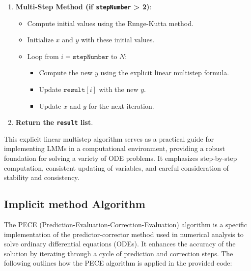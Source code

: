 \begin{enumerate}
        \item \textbf{Multi-Step Method (if \texttt{stepNumber} > 2)}:
        \begin{itemize}
            \item Compute initial values using the Runge-Kutta method.
            \item Initialize $x$ and $y$ with these initial values.
            \item Loop from $i = \texttt{stepNumber}$ to $N$:
            \begin{itemize}
                \item Compute the new $y$ using the explicit linear multistep formula.
                \item Update $\texttt{result}[i]$ with the new $y$.
                \item Update $x$ and $y$ for the next iteration.
            \end{itemize}
        \end{itemize}
        
        \item \textbf{Return the \texttt{result} list}.
    \end{enumerate}

This explicit linear multistep algorithm serves as a practical guide for implementing LMMs in a computational environment, providing a robust foundation for solving a variety of ODE problems. It emphasizes step-by-step computation, consistent updating of variables, and careful consideration of stability and consistency.

 \newpage


\subsection{Implicit method Algorithm}

The PECE (Prediction-Evaluation-Correction-Evaluation) algorithm is a specific implementation of the predictor-corrector method used in numerical analysis to solve ordinary differential equations (ODEs). It enhances the accuracy of the solution by iterating through a cycle of prediction and correction steps. The following outlines how the PECE algorithm is applied in the provided code:

